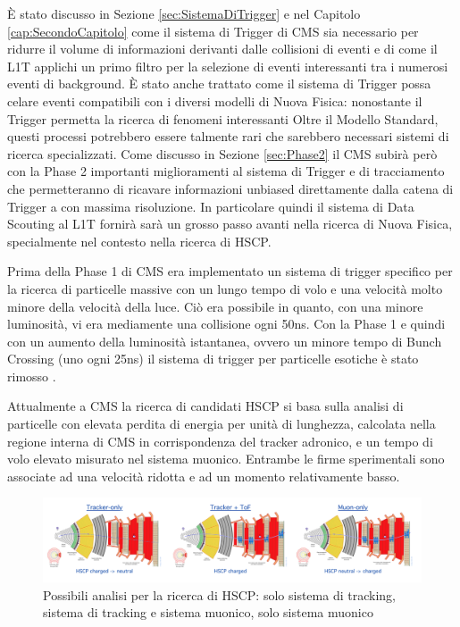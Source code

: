 È stato discusso in Sezione \ref{sec:SistemaDiTrigger} e nel Capitolo \ref{cap:SecondoCapitolo} come il sistema di Trigger di CMS sia necessario per ridurre il volume di informazioni derivanti dalle collisioni di eventi e di come il L1T applichi un primo filtro per la selezione di eventi interessanti tra i numerosi eventi di background. È stato anche trattato come il sistema di Trigger possa celare eventi compatibili con i diversi modelli di Nuova Fisica: nonostante il Trigger permetta la ricerca di fenomeni interessanti Oltre il Modello Standard, questi processi potrebbero essere talmente rari che sarebbero necessari sistemi di ricerca specializzati. \newline
Come discusso in Sezione \ref{sec:Phase2} il CMS subirà però con la Phase 2 importanti miglioramenti al sistema di Trigger e di tracciamento che permetteranno di ricavare informazioni unbiased direttamente dalla catena di Trigger a con massima risoluzione. In particolare quindi il sistema di Data Scouting al L1T fornirà sarà un grosso passo avanti nella ricerca di Nuova Fisica, specialmente nel contesto nella ricerca di HSCP. 

Prima della Phase 1 di CMS era implementato un sistema di trigger specifico per la ricerca di particelle massive con un lungo tempo di volo e una velocità molto minore della velocità della luce. Ciò era possibile in quanto, con una minore luminosità, vi era mediamente una collisione ogni 50ns. Con la Phase 1 e quindi con un aumento della luminosità istantanea, ovvero un minore tempo di Bunch Crossing (uno ogni 25ns) il sistema di trigger per particelle esotiche è stato rimosso \cite{MasterThesisGioMoc}.

Attualmente a CMS la ricerca di candidati HSCP si basa sulla analisi di particelle con elevata perdita di energia per unità di lunghezza, calcolata nella regione interna di CMS in corrispondenza del tracker adronico, e un tempo di volo elevato misurato nel sistema muonico. Entrambe le firme sperimentali sono associate ad una velocità ridotta e ad un momento relativamente basso.

\begin{figure}[t]
   \centering
     \centering
     \includegraphics[width=\textwidth]{../ImmaginiTesi/HSCPsearch.png} 
     \caption{Possibili analisi per la ricerca di HSCP: solo sistema di tracking, sistema di tracking e sistema muonico, solo sistema muonico}
   \label{fig:HSCPSearch}
 \end{figure}

